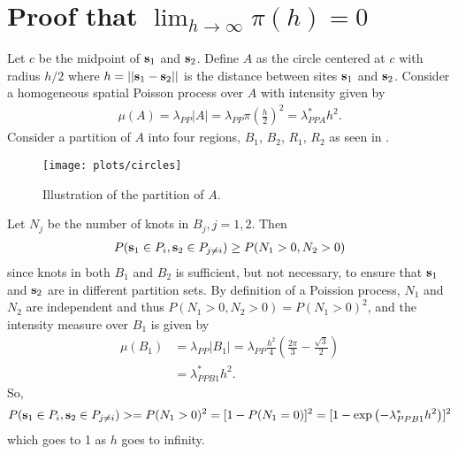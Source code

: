 \section{Proof that $\lim_{h \rightarrow \infty} \pi(h) = 0$} \label{sta:proofsamepartition}
Let $c$ be the midpoint of $\mathbf{s}_1$ and $\mathbf{s}_2$.
Define $A$ as the circle centered at $c$ with radius $h / 2$ where $h = ||\mathbf{s}_1 - \mathbf{s}_2||$ is the distance between sites $\mathbf{s}_1$ and $\mathbf{s}_2$.
Consider a homogeneous spatial Poisson process over $A$ with intensity given by
\begin{align*}
  \mu(A) = \lambda_{PP} |A| = \lambda_{PP} \pi \left(\frac{h}{2}\right)^2 = \lambda_{PPA}^* h^2.
\end{align*}
Consider a partition of $A$ into four regions, $B_1$, $B_2$, $R_1$, $R_2$ as seen in .
\begin{figure}
  \texttt{[image: plots/circles]}
  \caption{Illustration of the partition of $A$.}
  \label{stfig:hpp}
\end{figure}
Let $N_j$ be the number of knots in $B_j, j = 1, 2$.
Then
\begin{align}
  P(\mathbf{s}_1 \in P_i, \mathbf{s}_2 \in P_{j \neq i}) \ge P(N_1 > 0, N_2 > 0)
\end{align}
since knots in both $B_1$ and $B_2$ is sufficient, but not necessary, to ensure that $\mathbf{s}_1$ and $\mathbf{s}_2$ are in different partition sets.
By definition of a Poission process, $N_1$ and $N_2$ are independent and thus $P(N_1 > 0, N_2 > 0) = P(N_1 > 0)^2$, and the intensity measure over $B_1$ is given by
\begin{align}
  \mu(B_1) &= \lambda_{PP} |B_1| = \lambda_{PP} \frac{h^2}{4} \left(\frac{2 \pi}{3} - \frac{\sqrt{3}}{2} \right) \nonumber \\
       &= \lambda^*_{PPB1} h^2.
\end{align}
So,
\begin{align}
  P(\mathbf{s}_1 \in P_i, \mathbf{s}_2 \in P_{j \neq i}) >= P(N_1 > 0)^2 = [1 - P(N_1 = 0)]^2 = [1 - \exp\left(-\lambda^*_{PPB1} h^2\right)]^2
\end{align}
which goes to 1 as $h$ goes to infinity.


